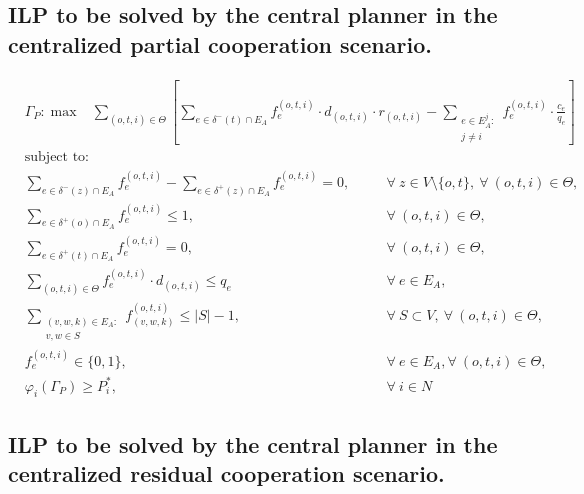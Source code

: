 \documentclass[review]{elsarticle}
\begin{document}
\subsection{ILP to be solved by the central planner in the centralized partial cooperation scenario.}

 \begin{align}
        &  \Gamma_P: \max  & \sum_{(o,t,i) \in \Theta} \left[\sum_{e \in \delta^-(t)\cap E_A}  f_e^{(o,t,i)} \cdot d_{(o,t,i)} \cdot r_{(o,t,i)} - \sum_{\substack{e \in E_A^j\colon \\ j\not = i}} f_e^{(o,t,i)} \cdot \frac{c_e}{q_e} \right] &&   \label{eq:Partial2CooperationA} 
    \end{align}
    \begin{align}
        & \text{subject to:}       && \nonumber\\
        & \sum_{e \in \delta^-(z)\cap E_A} f_e^{(o,t,i)}-\sum_{e \in \delta^+(z)\cap E_A} f_{e}^{(o,t,i)} = 0,            \quad && \forall\ z\in V\setminus\{o,t\},\ \forall\ (o,t,i)\in\Theta,  \label{eq:Partial2CooperationB}\\[1em]
& \sum_{e \in \delta^+(o)\cap E_A} f_e^{(o,t,i)} \leq 1,  && \forall\ (o,t,i)\in \Theta, \label{eq:Partial2CooperationC} \\
& \sum_{e \in \delta^+(t)\cap E_A} f_e^{(o,t,i)} = 0,  && \forall\ (o,t,i)\in \Theta, \label{eq:Partial2CooperationD} \\
 & \sum_{(o,t,i) \in \Theta} f_e^{(o,t,i)}\cdot d_{(o,t,i)} \leq q_e     && \forall\ e \in E_A, \label{eq:Partial2CooperationE_A}  \\
 & \sum_{\substack{(v,w,k) \in E_A\colon \\ v,w \in S}} f_{(v,w,k)}^{(o,t,i)}  \leq |S| -1,    && \forall\ S \subset V,\ \forall\ (o,t,i) \in \Theta, \label{eq:Partial2CooperationF}\\
 & f_e^{(o,t,i)}  \in \{0,1\},    && \forall\ e \in E_A, \forall\ (o,t,i) \in \Theta, \label{eq:Partial2CooperationG} \\
& \varphi_i(\Gamma_P)   \geq P_i^*,     && \forall\ i\in N \label{eq:Partial2CooperationH}
    \end{align}

\subsection{ILP to be solved by the central planner in the centralized residual cooperation scenario.}
\end{document}
